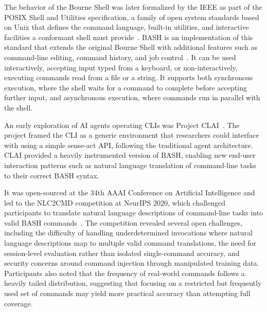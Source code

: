 \documentclass[
english,                 %
bibtex,                  %
includeExtraAbstracts, %
]{kththesis}
\numberwithin{listing}{chapter}
\begin{document}
The behavior of the Bourne Shell was later formalized by the \gls{IEEE} as part of the \gls{POSIX} Shell and Utilities specification, a family of open system standards based on Unix that defines the command language, built-in utilities, and interactive facilities a conformant shell must provide~\cite{ramey_whats_1994}. \Gls{BASH} is an implementation of this standard that extends the original Bourne Shell with additional features such as command-line editing, command history, and job control~\cite{ramsey_gnu_2025}. It can be used interactively, accepting input typed from a keyboard, or non-interactively, executing commands read from a file or a string. It supports both synchronous execution, where the shell waits for a command to complete before accepting further input, and asynchronous execution, where commands run in parallel with the shell.

An early exploration of \gls{AI} agents operating \glspl{CLI} was Project \Gls{CLAI}~\cite{agarwal_project_2020}. The project framed the \gls{CLI} as a generic environment that researchers could interface with using a simple sense-act \gls{API}, following the traditional agent architecture. \Gls{CLAI} provided a heavily instrumented version of \gls{BASH}, enabling new end-user interaction patterns such as natural language translation of command-line tasks to their correct \gls{BASH} syntax.

It was open-sourced at the 34th \gls{AAAI} Conference on Artificial Intelligence and led to the \Gls{NLC2CMD} competition at \gls{NeurIPS} 2020, which challenged participants to translate natural language descriptions of command-line tasks into valid \gls{BASH} commands~\cite{agarwal_neurips_2021}. The competition revealed several open challenges, including the difficulty of handling underdetermined invocations where natural language descriptions map to multiple valid command translations, the need for session-level evaluation rather than isolated single-command accuracy, and security concerns around command injection through manipulated training data. Participants also noted that the frequency of real-world commands follows a heavily tailed distribution, suggesting that focusing on a restricted but frequently used set of commands may yield more practical accuracy than attempting full coverage.
\end{document}
